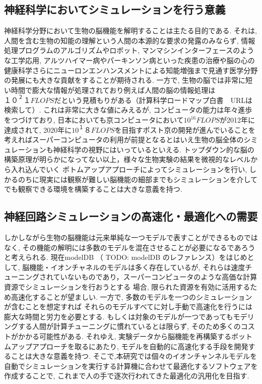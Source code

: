\subsection{神経科学においてシミュレーションを行う意義}
神経科学分野において生物の脳機能を解明することは主たる目的である.
それは, 人間を含む生物の知能の理解という人間の本源的な要求の発露のみならず,
情報処理プログラムのアルゴリズムやロボット, マンマシンインターフェースのような工学応用,
アルツハイマー病やパーキンソン病といった疾患の治療や脳の心の健康科学さらにニューロンエンハンスメントによる知能増強まで見通す医学分野の発展にも大きな貢献をすることが期待される.
一方で, 生物の脳では非常に短い時間で膨大な情報が処理されており例えば人間の脳の情報処理は$１０^２１FLOPS$だという見積もりがある（計算科学ロードマップ白書　URLは検索して）.
これは非常に大きな値にみえるが, コンピュータの能力は年々進歩をつづけており,
日本においても京コンピュータにおいて$10^16FLOPS$が2012年に達成されて,
2020年に$10^１８FLOPS$を目指すポスト京の開発が進んでいることを考えればスーパーコンピュータの利用が前提となるとはいえ生物の脳全体のシミュレーションも神経科学の視野にはいっているといえる.
トップダウン的な脳の構築原理が明らかになってない以上，様々な生物実験の結果を微視的なレベルから入れ込んでいく ボトムアップアプローチによってシミュレーションを行い,
しかるのちに現実には観察が難しい脳機能の細部までもシミュレーションを介してでも観察できる環境を構築することは大きな意義を持つ.



\subsection{神経回路シミュレーションの高速化・最適化への需要}
しかしながら生物の脳機能は元来単純な一つモデルで表すことができるものではなく,
その機能の解明には多数のモデルを混在させることが必要になるであろうと考えられる.
現在modelDB （ TODO: modelDB のレファレンス）をはじめとして, 脳機能・イオンチャネルのモデルは多く存在しているが,
それらは速度チューニングされていないものであり，スーパーコンピュータのような高価な計算資源でシミュレーションを行おうとする
場合, 限られた資源を有効に活用するため高速化することが望ましい.
一方で, 多数のモデルを一つのシミュレーションが含むことを想定すれば
それらのモデルすべてに対し手動で高速化を行うには膨大な時間と労力を必要とする.
もしくは対象のモデルが一つであってもモデリングする人間が計算チューニングに慣れているとは限らず,
そのため多くのコストがかかる可能性がある.
それゆえ, 実験データから脳機能を再構築するボットムアップアプローチを取るにあたり,
モデルを自動的に高速化する手段を開発することは大きな意義を持つ.
そこで,本研究では個々のイオンチャンネルモデルを自動でシミュレーションを実行する計算機に合わせて最適化するソフトウェアを作成することで,
これまで人の手で逐次行われてきた最適化の汎用化を目指す.
